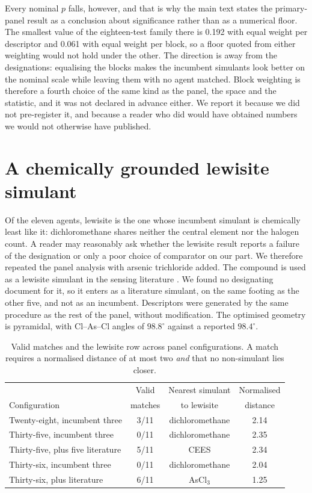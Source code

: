 \documentclass[11pt,a4paper]{article}
\begin{document}
Every nominal $p$ falls, however, and that is why the main text states the
primary-panel result as a conclusion about significance rather than as a
numerical floor. The smallest value of the eighteen-test family there is 0.192
with equal weight per descriptor and 0.061 with equal weight per block, so a
floor quoted from either weighting would not hold under the other. The direction
is away from the designations: equalising the blocks makes the incumbent
simulants look better on the nominal scale while leaving them with no agent
matched. Block weighting is therefore a fourth choice of the same kind as the
panel, the space and the statistic, and it was not declared in advance either.
We report it because we did not pre-register it, and because a reader who did
would have obtained numbers we would not otherwise have published.

\section{A chemically grounded lewisite simulant}
\label{sec:si-ascl3}

\begin{sloppypar}
Of the eleven agents, lewisite is the one whose incumbent simulant is
chemically least like it: dichloromethane shares neither the central element
nor the halogen count. A reader may reasonably ask whether the lewisite result
reports a failure of the designation or only a poor choice of comparator on
our part. We therefore repeated the panel analysis with arsenic trichloride
added. The compound is used as a lewisite simulant in the sensing
literature \cite{lee2016lewisite}. We found no designating document for it,
so it enters as a literature simulant, on the same footing as the other
five, and not as an incumbent. Descriptors were generated by the same procedure as the
rest of the panel, without modification. The optimised geometry is pyramidal,
with Cl--As--Cl angles of $98.8^\circ$ against a reported $98.4^\circ$.
\end{sloppypar}

\begin{table}[htbp]
\centering
\caption{Valid matches and the lewisite row across panel configurations.
A match requires a normalised distance of at most two \emph{and} that no
non-simulant lies closer.}
\label{tab:si-ascl3}
\small
\begin{tabular}{@{}lccc@{}}
\hline
 & Valid & Nearest simulant & Normalised \\
Configuration & matches & to lewisite & distance \\
\hline
Twenty-eight, incumbent three & 3/11 & dichloromethane & 2.14 \\
Thirty-five, incumbent three & 0/11 & dichloromethane & 2.35 \\
Thirty-five, plus five literature & 5/11 & CEES & 2.34 \\
Thirty-six, incumbent three & 0/11 & dichloromethane & 2.04 \\
Thirty-six, plus literature & 6/11 & AsCl$_3$ & 1.25 \\
\hline
\end{tabular}
\end{table}
\end{document}
